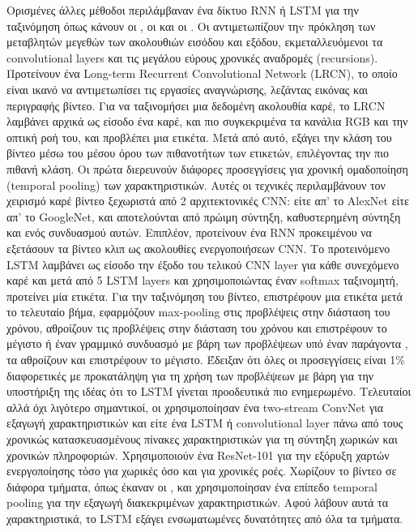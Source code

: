 Ορισμένες άλλες μέθοδοι περιλάμβαναν ένα δίκτυο \en RNN \gr  ή  \en LSTM  \gr για την ταξινόμηση όπως κάνουν οι \en\cite{DBLP:journals/corr/DonahueHGRVSD14}\gr, οι \en \cite{DBLP:journals/corr/NgHVVMT15} \gr
και οι \en \cite{DBLP:journals/corr/MaCKA17}\gr. Οι  \en \cite{DBLP:journals/corr/DonahueHGRVSD14}\gr αντιμετωπίζουν τηv  πρόκληση των μεταβλητών μεγεθών των ακολουθιών εισόδου και εξόδου,
εκμεταλλευόμενοι τα \en convolutional layers \gr  και τις μεγάλου εύρους χρονικές αναδρομές (\en recursions\gr). Προτείνουν ένα \en Long-term Recurrent
Convolutional Network (LRCN)\gr, το οποίο είναι ικανό να αντιμετωπίσει  τις εργασίες αναγνώρισης, λεζάντας εικόνας και περιγραφής βίντεο.
Για να ταξινομήσει μια δεδομένη ακολουθία καρέ, το \en LRCN \gr λαμβάνει αρχικά ως είσοδο ένα καρέ, και πιο συγκεκριμένα τα κανάλια \en RGB \gr και την οπτική ροή του, και προβλέπει μια ετικέτα.
Μετά από αυτό, εξάγει την  κλάση  του βίντεο μέσω του  μέσου όρου των πιθανοτήτων των ετικετών, επιλέγοντας την πιο πιθανή κλάση.
Οι  \en\cite{DBLP:journals/corr/NgHVVMT15}  \gr πρώτα διερευνούν  διάφορες προσεγγίσεις για χρονική ομαδοποίηση (\en temporal pooling\gr) των χαρακτηριστικών.
Αυτές οι τεχνικές περιλαμβάνουν τον χειρισμό καρέ βίντεο ξεχωριστά από 2 αρχιτεκτονικές \en  CNN\gr: είτε απ' το \en AlexNet \gr είτε απ' το \en GoogleNet\gr, και αποτελούνται από 
πρώιμη σύντηξη, καθυστερημένη σύντηξη και  ενός συνδυασμού αυτών. Επιπλέον, προτείνουν ένα \en RNN \gr προκειμένου να εξετάσουν τα βίντεο κλιπ
ως ακολουθίες ενεργοποιήσεων \en CNN\gr. Το προτεινόμενο \en LSTM \gr λαμβάνει ως είσοδο την έξοδο του τελικού \en CNN layer \gr για κάθε συνεχόμενο καρέ και μετά από 5 \en LSTM layers \gr και χρησιμοποιώντας
έναν \en softmax \gr ταξινομητή, προτείνει μία ετικέτα. Για την ταξινόμηση του βίντεο,  επιστρέφουν μια ετικέτα μετά το τελευταίο βήμα, εφαρμόζουν \en max-pooling \gr στις προβλέψεις στην διάσταση
του χρόνου, αθροίζουν τις προβλέψεις στην διάσταση του χρόνου και επιστρέφουν το μέγιστο ή έναν γραμμικό συνδυασμό με βάρη των προβλέψεων υπό έναν παράγοντα , τα αθροίζουν και επιστρέφουν το μέγιστο.
Έδειξαν ότι όλες οι προσεγγίσεις είναι 1\% διαφορετικές με προκατάληψη για τη χρήση των προβλέψεων με βάρη 
για την υποστήριξη της ιδέας ότι το \en LSTM \gr γίνεται προοδευτικά πιο ενημερωμένο. Τελευταίοι 
αλλά όχι λιγότερο σημαντικοί, οι \en \cite{DBLP:journals/corr/MaCKA17} \gr χρησιμοποίησαν ένα \en two-stream ConvNet \gr για  εξαγωγή χαρακτηριστικών και είτε ένα \en
LSTM \gr ή  \en convolutional layer \gr πάνω από τους χρονικώς κατασκευασμένους πίνακες χαρακτηριστικών για τη σύντηξη χωρικών και χρονικών πληροφοριών. Χρησιμοποιούν ένα \en ResNet-101 \gr
για την εξόρυξη χαρτών ενεργοποίησης  τόσο για χωρικές όσο και για χρονικές ροές. Χωρίζουν το 
βίντεο σε διάφορα τμήματα, όπως έκαναν οι \en \cite{DBLP:journals/corr/WangXW0LTG16}\gr, και χρησιμοποίησαν ένα επίπεδο  \en temporal pooling \gr για την εξαγωγή διακεκριμένων χαρακτηριστικών.
Αφού λάβουν αυτά τα χαρακτηριστικά, το \en LSTM  \gr
εξάγει ενσωματωμένες δυνατότητες από όλα τα τμήματα. \par


